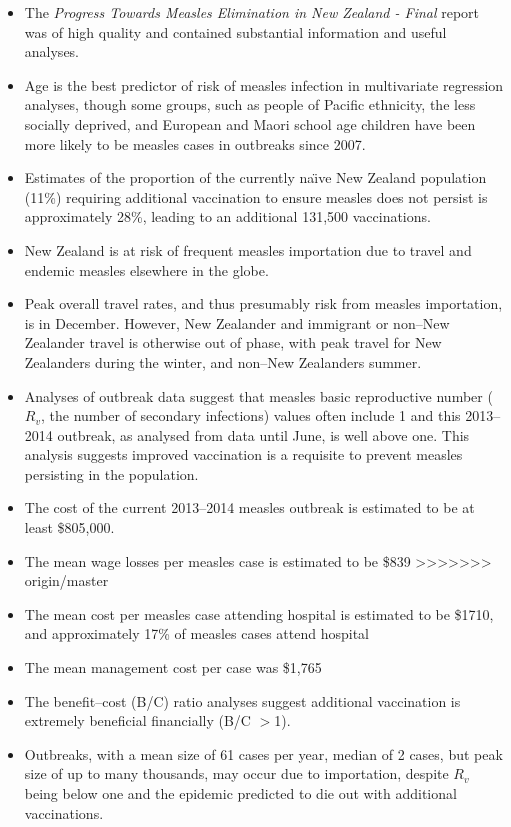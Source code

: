 \documentclass{article}
\begin{document}
\begin{itemize}
\begin{itemize}
\item The \emph {Progress Towards Measles Elimination in New Zealand - Final} report was of high quality and contained substantial information and useful analyses.
\item Age is the best predictor of risk of measles infection in multivariate regression analyses, though some groups, such as people of Pacific ethnicity, the less socially deprived, and European and Maori school age children have been more likely to be measles cases in outbreaks since 2007.
\item Estimates of the proportion of the currently na\"{\i}ve New Zealand population (11\%) requiring additional vaccination to ensure measles does not persist is approximately 28\%, leading to an additional 131,500 vaccinations.
\item New Zealand is at risk of frequent measles importation due to travel and endemic measles elsewhere in the globe.
\item Peak overall travel rates, and thus presumably risk from measles importation, is in December. However, New Zealander and immigrant or non--New Zealander travel is otherwise out of phase, with peak travel for New Zealanders during the winter, and non--New Zealanders summer.
\item Analyses of outbreak data suggest that measles basic reproductive number ($R_v$, the number of secondary infections) values often include 1 and this 2013--2014 outbreak, as analysed from data until June, is well above one. This analysis suggests improved vaccination is a requisite to prevent measles persisting in the population.
\item The cost of the current 2013--2014 measles outbreak is estimated to be at least \$805,000.
\item The mean wage losses per measles case is estimated to be \$839
>>>>>>> origin/master
\item The mean cost per measles case attending hospital is estimated to be \$1710, and approximately 17\% of measles cases attend hospital
\item The mean management cost per case was \$1,765
\item The benefit--cost (B/C) ratio analyses suggest additional vaccination is extremely beneficial financially (B/C $>$1).
\item Outbreaks, with a mean size of 61 cases per year, median of 2 cases, but peak size of up to many thousands, may occur due to importation, despite $R_v$ being below one and the epidemic predicted to die out with additional vaccinations.
\end{itemize}


\end{itemize}
\end{document}
